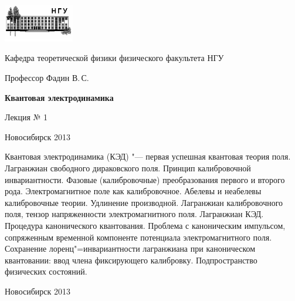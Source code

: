 \documentclass[12pt,pagesize,paper=192mm:108mm]{scrbook}
\begin{document}
\begin{titlepage}
  \vspace*{-1em}
  \begin{center}
    \includegraphics[width=0.23\textwidth]{../NSU-logo}

    Кафедра теоретической физики физического факультета НГУ
    \medskip

    \Large
    Профессор Фадин В.\,С.
    \bigskip

    \huge
    \textbf{Квантовая электродинамика}
    \bigskip

    \Large
    Лекция № 1
    \vfill

    \normalsize
    \vfill

    \normalsize \ccbysa\hspace{0.5em}  Новосибирск 2013
  \end{center}
\end{titlepage}
\newpage

\vspace*{-1em}
\begin{center}
\vfill
  \begin{minipage}{0.65\linewidth}
    Квантовая электродинамика (КЭД) "--- первая успешная квантовая
    теория поля. Лагранжиан свободного дираковского поля. Принцип
    калибровочной инвариантности. Фазовые (калибровочные)
    преобразования первого и второго рода. Электромагнитное поле как
    калибровочное. Абелевы и неабелевы калибровочные теории. Удлинение
    производной.  Лагранжиан калибровочного поля, тензор напряженности
    электромагнитного поля.  Лагранжиан КЭД. Процедура канонического
    квантования. Проблема с каноническим импульсом, сопряженным
    временной компоненте потенциала электромагнитного поля.
    Сохранение лоренц"=инвариантности лагранжиана при каноническом
    квантовании: ввод члена фиксирующего калибровку. Подпространство
    физических состояний.
  \end{minipage}
  \vfill

  \normalsize \ccbysa\hspace{0.5em} Новосибирск 2013
\end{center}
\end{document}
